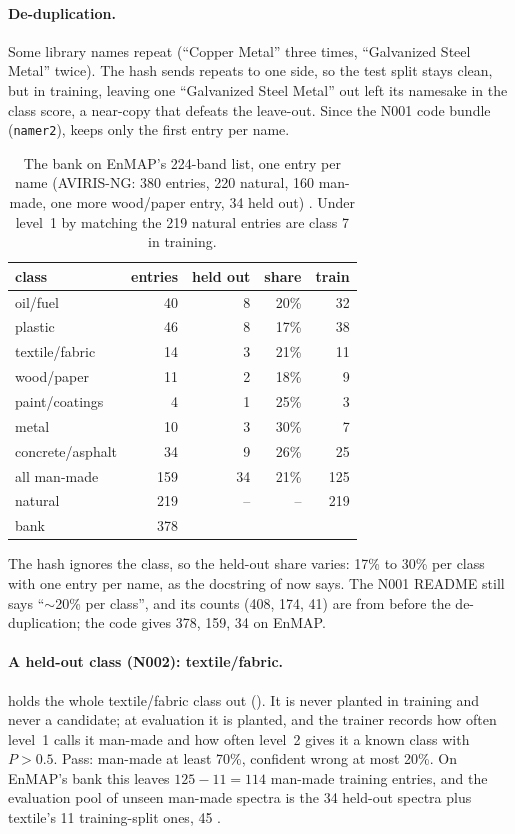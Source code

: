 \paragraph{De-duplication.} Some library names repeat (``Copper Metal'' three times, ``Galvanized Steel Metal''
twice). The hash sends repeats to one side, so the test split stays clean, but in training, leaving one ``Galvanized
Steel Metal'' out left its namesake in the class score, a near-copy that defeats the leave-out. Since the N001 code
bundle (\texttt{namer2}),  keeps only the first entry per name.

\begin{table}[htbp]
\centering\small
\begin{tabular}{lrrrr}
\toprule
class & entries & held out & share & train\\
\midrule
oil/fuel & 40 & 8 & 20\% & 32\\
plastic & 46 & 8 & 17\% & 38\\
textile/fabric & 14 & 3 & 21\% & 11\\
wood/paper & 11 & 2 & 18\% & 9\\
paint/coatings & 4 & 1 & 25\% & 3\\
metal & 10 & 3 & 30\% & 7\\
concrete/asphalt & 34 & 9 & 26\% & 25\\
\midrule
all man-made & 159 & 34 & 21\% & 125\\
natural & 219 & -- & -- & 219\\
\midrule
bank & 378 & & & \\
\bottomrule
\end{tabular}
\caption{The bank on EnMAP's 224-band list, one entry per name (AVIRIS-NG: 380 entries, 220 natural, 160 man-made,
one more wood/paper entry, 34 held out) \tagC. Under level~1 by matching the 219 natural entries are class 7 in
training.}
\label{tab:namer:split}
\end{table}

\begin{sourcenote}
The hash ignores the class, so the held-out share varies: 17\% to 30\% per class with one entry per name, as the
docstring of  now says. The N001 README still says ``$\sim$20\% per class'', and its counts (408,
174, 41) are from before the de-duplication; the code gives 378, 159, 34 on EnMAP.
\end{sourcenote}

\paragraph{A held-out class (N002): textile/fabric.}  holds the whole textile/fabric class
out (). It is never planted in training and never a candidate; at evaluation it
is planted, and the trainer records how often level~1 calls it man-made and how often level~2 gives it a known class
with $P>0.5$. Pass: man-made at least 70\%, confident wrong at most 20\%. On EnMAP's bank this leaves
$125-11=114$ man-made training entries, and the evaluation pool of unseen man-made spectra is the 34 held-out spectra
plus textile's 11 training-split ones, 45 \tagC.

